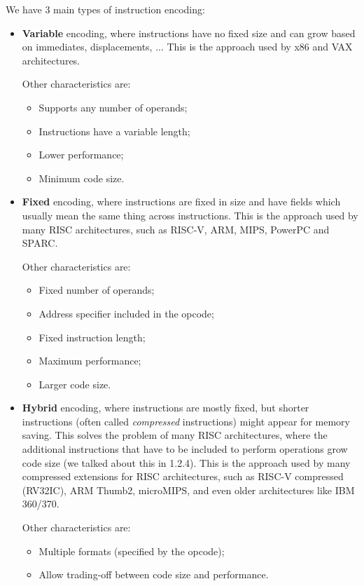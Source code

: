 \documentclass[a4paper,11pt]{article}
\begin{document}
We have 3 main types of instruction encoding:
\begin{itemize}
	\item \textbf{Variable} encoding, where instructions have no fixed size and can grow based on immediates, displacements, ... This is the approach used by x86 and VAX architectures.

	      Other characteristics are:
	      \begin{itemize}
		      \item Supports any number of operands;
		      \item Instructions have a variable length;
		      \item Lower performance;
		      \item Minimum code size.
	      \end{itemize}

	\item \textbf{Fixed} encoding, where instructions are fixed in size and have fields which usually mean the same thing across instructions. This is the approach used by many RISC architectures, such as RISC-V, ARM, MIPS, PowerPC and SPARC.

	      Other characteristics are:
	      \begin{itemize}
		      \item Fixed number of operands;
		      \item Address specifier included in the opcode;
		      \item Fixed instruction length;
		      \item Maximum performance;
		      \item Larger code size.
	      \end{itemize}

	\item \textbf{Hybrid} encoding, where instructions are mostly fixed, but shorter instructions (often called \textit{compressed} instructions) might appear for memory saving. This solves the problem of many RISC architectures, where the additional instructions that have to be included to perform operations grow code size (we talked about this in 1.2.4). This is the approach used by many compressed extensions for RISC architectures, such as RISC-V compressed (RV32IC), ARM Thumb2, microMIPS, and even older architectures like IBM 360/370.

	      Other characteristics are:
	      \begin{itemize}
		      \item Multiple formats (specified by the opcode);
		      \item Allow trading-off between code size and performance.
	      \end{itemize}
\end{itemize}
\end{document}
